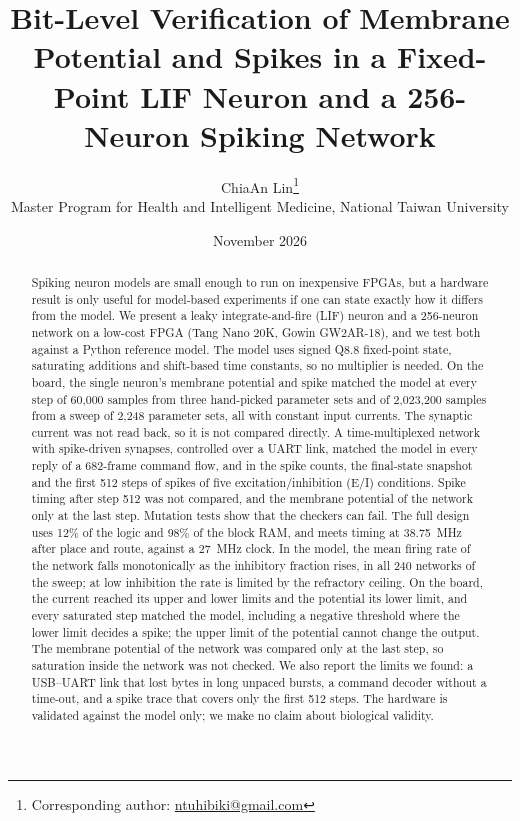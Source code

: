 \documentclass[11pt]{article}
\title{Bit-Level Verification of Membrane Potential and Spikes in a Fixed-Point LIF Neuron and a 256-Neuron Spiking Network}
\author{ChiaAn Lin\thanks{Corresponding author: \href{mailto:ntuhibiki@gmail.com}{ntuhibiki@gmail.com}}\\
Master Program for Health and Intelligent Medicine, National Taiwan University
}
\date{November 2026}
\begin{document}
\maketitle

\begin{abstract}
Spiking neuron models are small enough to run on inexpensive FPGAs, but a hardware result is only useful for model-based experiments if one can state exactly how it differs from the model.
We present a leaky integrate-and-fire (LIF) neuron and a 256-neuron network on a low-cost FPGA (Tang Nano 20K, Gowin GW2AR-18), and we test both against a Python reference model.
The model uses signed Q8.8 fixed-point state, saturating additions and shift-based time constants, so no multiplier is needed.
On the board, the single neuron's membrane potential and spike matched the model at every step of 60,000 samples from three hand-picked parameter sets and of 2,023,200 samples from a sweep of 2,248 parameter sets, all with constant input currents. The synaptic current was not read back, so it is not compared directly.
A time-multiplexed network with spike-driven synapses, controlled over a UART link, matched the model in every reply of a 682-frame command flow, and in the spike counts, the final-state snapshot and the first 512 steps of spikes of five excitation/inhibition (E/I) conditions. Spike timing after step 512 was not compared, and the membrane potential of the network only at the last step.
Mutation tests show that the checkers can fail.
The full design uses 12\% of the logic and 98\% of the block RAM, and meets timing at 38.75~MHz after place and route, against a 27~MHz clock.
In the model, the mean firing rate of the network falls monotonically as the inhibitory fraction rises, in all 240 networks of the sweep; at low inhibition the rate is limited by the refractory ceiling.
On the board, the current reached its upper and lower limits and the potential its lower limit, and every saturated step matched the model, including a negative threshold where the lower limit decides a spike; the upper limit of the potential cannot change the output. The membrane potential of the network was compared only at the last step, so saturation inside the network was not checked.
We also report the limits we found: a USB--UART link that lost bytes in long unpaced bursts, a command decoder without a time-out, and a spike trace that covers only the first 512 steps.
The hardware is validated against the model only; we make no claim about biological validity.
\end{abstract}
\end{document}

